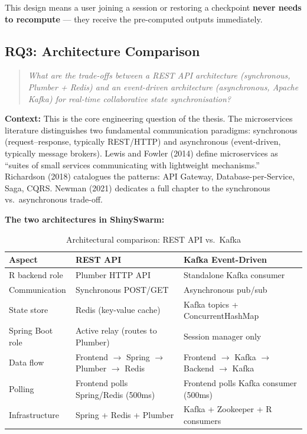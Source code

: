 \documentclass[12pt,a4paper]{article}
\begin{document}
This design means a user joining a session or restoring a checkpoint \textbf{never needs to recompute} --- they receive the pre-computed outputs immediately.

\subsection{RQ3: Architecture Comparison}

\begin{quote}
\textit{What are the trade-offs between a REST API architecture (synchronous, Plumber + Redis) and an event-driven architecture (asynchronous, Apache Kafka) for real-time collaborative state synchronisation?}
\end{quote}

\textbf{Context:} This is the core engineering question of the thesis. The microservices literature distinguishes two fundamental communication paradigms: synchronous (request--response, typically REST/HTTP) and asynchronous (event-driven, typically message brokers). Lewis and Fowler (2014) define microservices as ``suites of small services communicating with lightweight mechanisms.'' Richardson (2018) catalogues the patterns: API Gateway, Database-per-Service, Saga, CQRS. Newman (2021) dedicates a full chapter to the synchronous vs.\ asynchronous trade-off.

\textbf{The two architectures in ShinySwarm:}

\begin{table}[h]
\centering
\small
\begin{tabular}{@{}lll@{}}
\toprule
\textbf{Aspect} & \textbf{REST API} & \textbf{Kafka Event-Driven} \\
\midrule
R backend role & Plumber HTTP API & Standalone Kafka consumer \\
Communication & Synchronous POST/GET & Asynchronous pub/sub \\
State store & Redis (key-value cache) & Kafka topics + ConcurrentHashMap \\
Spring Boot role & Active relay (routes to Plumber) & Session manager only \\
Data flow & Frontend $\rightarrow$ Spring $\rightarrow$ Plumber $\rightarrow$ Redis & Frontend $\rightarrow$ Kafka $\rightarrow$ Backend $\rightarrow$ Kafka \\
Polling & Frontend polls Spring/Redis (500ms) & Frontend polls Kafka consumer (500ms) \\
Infrastructure & Spring + Redis + Plumber & Kafka + Zookeeper + R consumers \\
\bottomrule
\end{tabular}
\caption{Architectural comparison: REST API vs.\ Kafka}
\end{table}
\end{document}
